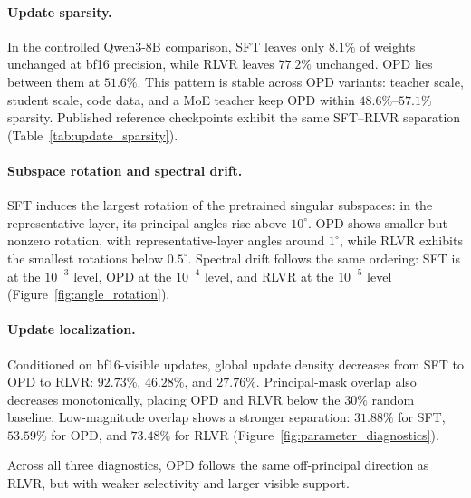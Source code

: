 \documentclass{llmxive}
\begin{document}
\paragraph{Update sparsity.}
In the controlled Qwen3-8B comparison, SFT leaves only $8.1\%$ of weights
unchanged at bf16 precision, while RLVR leaves $77.2\%$ unchanged.
OPD lies between them at $51.6\%$. This pattern is stable across OPD
variants: teacher scale, student scale, code data, and a MoE teacher keep
OPD within $48.6\%$--$57.1\%$ sparsity. Published reference checkpoints
exhibit the same SFT--RLVR separation (Table~\ref{tab:update_sparsity}).

\paragraph{Subspace rotation and spectral drift.}
SFT induces the largest rotation of the pretrained singular subspaces:
in the representative layer, its principal angles rise above $10^\circ$.
OPD shows smaller but nonzero rotation, with representative-layer angles
around $1^\circ$, while RLVR exhibits the smallest rotations below
$0.5^\circ$. Spectral drift follows the same ordering: SFT is at the
$10^{-3}$ level, OPD at the $10^{-4}$ level, and RLVR at the $10^{-5}$
level (Figure~\ref{fig:angle_rotation}).

\paragraph{Update localization.}
Conditioned on bf16-visible updates, global update density decreases from
SFT to OPD to RLVR: $92.73\%$, $46.28\%$, and $27.76\%$. Principal-mask
overlap also decreases monotonically, placing OPD and RLVR below the
$30\%$ random baseline. Low-magnitude overlap shows a stronger separation:
$31.88\%$ for SFT, $53.59\%$ for OPD, and $73.48\%$ for RLVR
(Figure~\ref{fig:parameter_diagnostics}).

Across all three diagnostics, OPD follows the same off-principal direction as RLVR, but with weaker selectivity and larger visible support.

\end{document}
